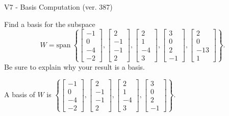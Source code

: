 \begin{exercise}
  \begin{exerciseTitle}V7 - Basis Computation (ver. 387)\end{exerciseTitle}
  \begin{exerciseStatement}
    Find a basis for the subspace 
\[W=\mathrm{span}\ \left\{\left[\begin{array}{r}
-1 \\
0 \\
-4 \\
-2
\end{array}\right] , \left[\begin{array}{r}
2 \\
-1 \\
-1 \\
2
\end{array}\right] , \left[\begin{array}{r}
2 \\
1 \\
-4 \\
3
\end{array}\right] , \left[\begin{array}{r}
3 \\
0 \\
2 \\
-1
\end{array}\right] , \left[\begin{array}{r}
2 \\
0 \\
-13 \\
1
\end{array}\right]\right\}.\]
 Be sure to explain why your result is a basis.


  \end{exerciseStatement}
  \begin{exerciseAnswer}
   A basis of \(W\) is  \(\left\{\left[\begin{array}{r}
-1 \\
0 \\
-4 \\
-2
\end{array}\right] , \left[\begin{array}{r}
2 \\
-1 \\
-1 \\
2
\end{array}\right] , \left[\begin{array}{r}
2 \\
1 \\
-4 \\
3
\end{array}\right] , \left[\begin{array}{r}
3 \\
0 \\
2 \\
-1
\end{array}\right]\right\}\).
  


  \end{exerciseAnswer}
\end{exercise}